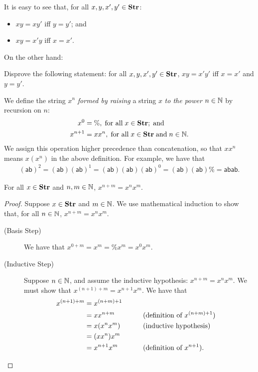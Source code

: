 It is easy to see that, for all $x,y,x',y'\in\mathbf{Str}$:
\begin{itemize}
\item $xy=xy'$ iff $y=y'$; and

\item $xy=x'y$ iff $x=x'$.
\end{itemize}

On the other hand:

\begin{exercise}
Disprove the following statement: for all
$x,y,x',y'\in\mathbf{Str}$, $xy = x'y'$ iff $x=x'$ and $y=y'$.
\end{exercise}

We define the string $x^n$ \emph{formed by raising}
a string $x$ \emph{to the power}
%
%
%
%
%
%
%
%
$n\in\mathbb{N}$ by recursion
%
on $n$:
\begin{align*}
x^0       &= \%,\;\allowbreak\mbox{for all}\allowbreak\;x\in\mathbf{Str} ; \;\allowbreak\mbox{and}\allowbreak \\
x^{n + 1} &= xx^n,\;\allowbreak\mbox{for all}\allowbreak\;x\in\mathbf{Str}\;\allowbreak\mbox{and}\allowbreak\;n\in\mathbb{N} .
\end{align*}
We assign this operation higher precedence than concatenation, so that
$xx^n$ means $x(x^n)$ in the above definition.
For example, we have that
\begin{gather*}
(\mathsf{ab})^2 = 
(\mathsf{ab})(\mathsf{ab})^1 =
(\mathsf{ab})(\mathsf{ab})(\mathsf{ab})^0 =
(\mathsf{ab})(\mathsf{ab})\% =
\mathsf{abab} .
\end{gather*}

\begin{proposition}
\label{StrPowerProp}
For all $x\in\mathbf{Str}$ and $n,m\in\mathbb{N}$, $x^{n+m}=x^nx^m$.
\end{proposition}

\begin{proof}
Suppose $x\in\mathbf{Str}$ and $m\in\mathbb{N}$.  We use mathematical induction
%
to show that, for all $n\in\mathbb{N}$, $x^{n+m} = x^nx^m$.
\begin{description}
\item[\quad(Basis Step)] We have that $x^{0+m}=x^m=\%x^m=x^0x^m$.

\item[\quad(Inductive Step)] Suppose $n\in\mathbb{N}$, and assume the
inductive hypothesis: $x^{n+m} = x^nx^m$.  We must show
that $x^{(n+1)+m} = x^{n+1}x^m$.  We have that
\begin{alignat*}{2}
x^{(n+1)+m} &= x^{(n+m)+1} \\
            &= xx^{n+m} && \qquad{\textrm{(definition of $x^{(n+m)+1}$)}} \\
            &= x(x^nx^m) && \qquad{\textrm{(inductive hypothesis)}} \\
            &= (xx^n)x^m \\
            &= x^{n+1}x^m && \qquad{\textrm{(definition of $x^{n+1}$)}} .
\end{alignat*}
\end{description}
\end{proof}

